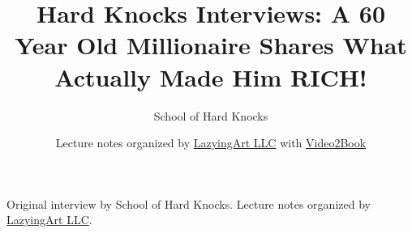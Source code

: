 \documentclass[11pt,oneside]{book}
\begin{document}
\frontmatter
\title{Hard Knocks Interviews: A 60 Year Old Millionaire Shares What Actually Made Him RICH!}
\author{School of Hard Knocks}
\date{Lecture notes organized by \href{https://lazying.art}{LazyingArt LLC} with \href{https://github.com/lachlanchen/Video2Book}{Video2Book}}
\maketitle
\begin{center}
\small Original interview by School of Hard Knocks. Lecture notes organized by \href{https://lazying.art}{LazyingArt LLC}.
\end{center}
\clearpage
\mainmatter

\end{document}
